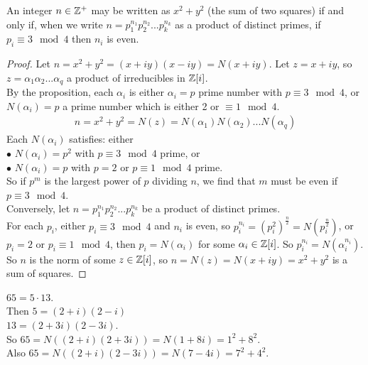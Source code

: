 \documentclass[a4paper]{article}
\begin{document}
\begin{coro}
An integer $n\in\mathbb{Z}^+$ may be written as $x^2 + y^2$ (the sum of two squares) if and only if, when we write $n=p_1^{n_1} p_2^{n_2} ... p_k^{n_k}$ as a product of distinct primes, if $p_i \equiv 3 \mod 4$ then $n_i$ is even.
\begin{proof}
Let $n=x^2+y^2 = \left(x+iy\right)\left(x-iy\right)=N\left(x+iy\right)$. Let $z=x+iy$, so $z=\alpha_1 \alpha_2...\alpha_q$ a product of irreducibles in $\mathbb{Z}[i]$.\\
By the proposition, each $\alpha_i$ is either $\alpha_i = p$ prime number with $p\equiv 3 \mod 4$, or $N\left(\alpha_i\right)=p$ a prime number which is either 2 or $\equiv 1 \mod 4$.
\begin{equation*}
\begin{aligned}
n=x^2+y^2=N\left(z\right)=N\left(\alpha_1\right)N\left(\alpha_2\right)...N\left(\alpha_q\right)
\end{aligned}
\end{equation*}
Each $N\left(\alpha_i\right)$ satisfies: either\\
$\bullet$ $N\left(\alpha_i\right) = p^2$ with $p\equiv 3 \mod 4$ prime, or\\
$\bullet$ $N\left(\alpha_i\right) = p$ with $p=2$ or $p\equiv 1 \mod 4$ prime.\\
So if $p^m$ is the largest power of $p$ dividing $n$, we find that $m$ must be even if $p\equiv 3 \mod 4$.\\

Conversely, let $n=p_1^{n_1}p_2^{n_2}...p_k^{n_k}$ be a product of distinct primes.\\
For each $p_i$, either $p_i \equiv 3 \mod 4$ and $n_i$ is even, so $p_i^{n_i} = \left(p_i^2\right)^{\frac{n}{2}} = N\left(p_i^\frac{n}{2}\right)$, or $p_i = 2$ or $p_i \equiv 1 \mod 4$, then $p_i = N\left(\alpha_i\right)$ for some $\alpha_i \in \mathbb{Z}[i]$. So $p_i^{n_i} = N\left(\alpha_i^{n_i}\right)$.\\
So $n$ is the norm of some $z\in\mathbb{Z}[i]$, so $n=N\left(z\right)=N\left(x+iy\right) = x^2+y^2$ is a sum of squares.
\end{proof}
\end{coro}

\begin{eg}
$65=5\cdot 13$.\\
Then $5=\left(2+i\right)\left(2-i\right)$\\
$13=\left(2+3i\right)\left(2-3i\right)$.\\
So $65 = N\left(\left(2+i\right)\left(2+3i\right)\right)=N\left(1+8i\right)=1^2+8^2$.\\
Also $65 = N\left(\left(2+i\right)\left(2-3i\right)\right)=N\left(7-4i\right)=7^2+4^2$.
\end{eg}
\end{document}
